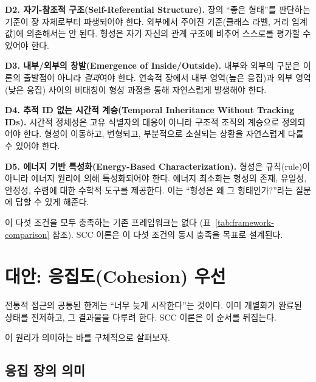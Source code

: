 \textbf{D2. 자기-참조적 구조(Self-Referential Structure).}
장의 ``좋은 형태''를 판단하는 기준이 장 자체로부터 파생되어야 한다. 외부에서 주어진 기준(클래스 라벨, 거리 임계값)에 의존해서는 안 된다. 형성은 자기 자신의 관계 구조에 비추어 스스로를 평가할 수 있어야 한다.

\textbf{D3. 내부/외부의 창발(Emergence of Inside/Outside).}
내부와 외부의 구분은 이론의 출발점이 아니라 \emph{결과}여야 한다. 연속적 장에서 내부 영역(높은 응집)과 외부 영역(낮은 응집) 사이의 비대칭이 형성 과정을 통해 자연스럽게 발생해야 한다.

\textbf{D4. 추적 ID 없는 시간적 계승(Temporal Inheritance Without Tracking IDs).}
시간적 정체성은 고유 식별자의 대응이 아니라 구조적 조직의 계승으로 정의되어야 한다. 형성이 이동하고, 변형되고, 부분적으로 소실되는 상황을 자연스럽게 다룰 수 있어야 한다.

\textbf{D5. 에너지 기반 특성화(Energy-Based Characterization).}
형성은 규칙(rule)이 아니라 에너지 원리에 의해 특성화되어야 한다. 에너지 최소화는 형성의 존재, 유일성, 안정성, 수렴에 대한 수학적 도구를 제공한다. 이는 ``형성은 왜 그 형태인가?''라는 질문에 답할 수 있게 해준다.

이 다섯 조건을 모두 충족하는 기존 프레임워크는 없다 (표~\ref{tab:framework-comparison} 참조). SCC 이론은 이 다섯 조건의 동시 충족을 목표로 설계된다.


\section{대안: 응집도(Cohesion) 우선}
\label{sec:cohesion-first}

전통적 접근의 공통된 한계는 ``너무 늦게 시작한다''는 것이다. 이미 개별화가 완료된 상태를 전제하고, 그 결과물을 다루려 한다. SCC 이론은 이 순서를 뒤집는다.

\begin{center}
\end{center}

이 원리가 의미하는 바를 구체적으로 살펴보자.

\subsection{응집 장의 의미}

